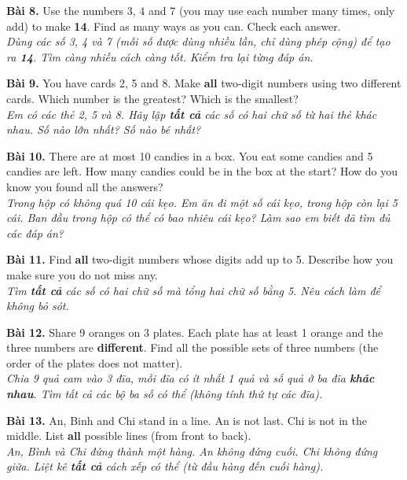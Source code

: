 \documentclass[11pt,a4paper]{article}
\newcommand{\answerline}{\noindent\dotfill\par\vspace{0.8mm}}
\begin{document}
\textbf{Bài 8.} Use the numbers 3, 4 and 7 (you may use each number many times, only add) to make \textbf{14}. Find as many ways as you can. Check each answer.\\
\textit{Dùng các số 3, 4 và 7 (mỗi số được dùng nhiều lần, chỉ dùng phép cộng) để tạo ra \textbf{14}. Tìm càng nhiều cách càng tốt. Kiểm tra lại từng đáp án.}\\
\answerline
\answerline

\textbf{Bài 9.} You have cards 2, 5 and 8. Make \textbf{all} two-digit numbers using two different cards. Which number is the greatest? Which is the smallest?\\
\textit{Em có các thẻ 2, 5 và 8. Hãy lập \textbf{tất cả} các số có hai chữ số từ hai thẻ khác nhau. Số nào lớn nhất? Số nào bé nhất?}\\
\answerline
\answerline

\textbf{Bài 10.} There are at most 10 candies in a box. You eat some candies and 5 candies are left. How many candies could be in the box at the start? How do you know you found all the answers?\\
\textit{Trong hộp có không quá 10 cái kẹo. Em ăn đi một số cái kẹo, trong hộp còn lại 5 cái. Ban đầu trong hộp có thể có bao nhiêu cái kẹo? Làm sao em biết đã tìm đủ các đáp án?}\\
\answerline
\answerline
\answerline

\textbf{Bài 11.} Find \textbf{all} two-digit numbers whose digits add up to 5. Describe how you make sure you do not miss any.\\
\textit{Tìm \textbf{tất cả} các số có hai chữ số mà tổng hai chữ số bằng 5. Nêu cách làm để không bỏ sót.}\\
\answerline
\answerline

\textbf{Bài 12.} Share 9 oranges on 3 plates. Each plate has at least 1 orange and the three numbers are \textbf{different}. Find all the possible sets of three numbers (the order of the plates does not matter).\\
\textit{Chia 9 quả cam vào 3 đĩa, mỗi đĩa có ít nhất 1 quả và số quả ở ba đĩa \textbf{khác nhau}. Tìm tất cả các bộ ba số có thể (không tính thứ tự các đĩa).}\\
\answerline
\answerline

\textbf{Bài 13.} An, Binh and Chi stand in a line. An is not last. Chi is not in the middle. List \textbf{all} possible lines (from front to back).\\
\textit{An, Bình và Chi đứng thành một hàng. An không đứng cuối. Chi không đứng giữa. Liệt kê \textbf{tất cả} cách xếp có thể (từ đầu hàng đến cuối hàng).}\\
\answerline
\answerline
\end{document}
